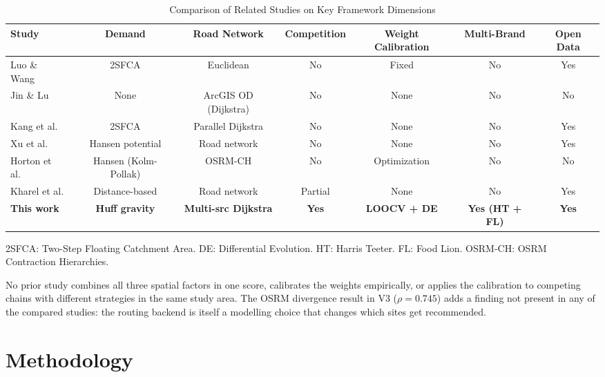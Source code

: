\documentclass[conference]{IEEEtran}
\begin{document}
\begin{table}[!t]
\centering
\caption{Comparison of Related Studies on Key Framework Dimensions}
\label{tab:comparison}
\renewcommand{\arraystretch}{1.2}
\begin{tabular}{lcccccc}
\toprule
\textbf{Study} &
\textbf{Demand} &
\textbf{Road Network} &
\textbf{Competition} &
\textbf{Weight Calibration} &
\textbf{Multi-Brand} &
\textbf{Open Data} \\
\midrule
Luo \& Wang~\cite{Luo2003} &
  2SFCA & Euclidean & No & Fixed & No & Yes \\
Jin \& Lu~\cite{Jin2022} &
  None & ArcGIS OD (Dijkstra) & No & None & No & No \\
Kang et al.~\cite{Kang2020} &
  2SFCA & Parallel Dijkstra & No & None & No & Yes \\
Xu et al.~\cite{Xu2020} &
  Hansen potential & Road network & No & None & No & Yes \\
Horton et al.~\cite{Horton2025} &
  Hansen (Kolm-Pollak) & OSRM-CH & No & Optimization & No & No \\
Kharel et al.~\cite{Kharel2024} &
  Distance-based & Road network & Partial & None & No & Yes \\
\midrule
\textbf{This work} &
  \textbf{Huff gravity} &
  \textbf{Multi-src Dijkstra} &
  \textbf{Yes} &
  \textbf{LOOCV + DE} &
  \textbf{Yes (HT + FL)} &
  \textbf{Yes} \\
\bottomrule
\end{tabular}
\vspace{2pt}
\footnotesize 2SFCA: Two-Step Floating Catchment Area. DE: Differential Evolution.
HT: Harris Teeter. FL: Food Lion. OSRM-CH: OSRM Contraction Hierarchies.
\end{table}

No prior study combines all three spatial factors in one score,
calibrates the weights empirically, or applies the calibration to
competing chains with different strategies in the same study area.
The OSRM divergence result in V3 ($\rho = 0.745$) adds a finding not
present in any of the compared studies: the routing backend is itself
a modelling choice that changes which sites get recommended.

\section{Methodology}
\label{sec:method}
\end{document}
